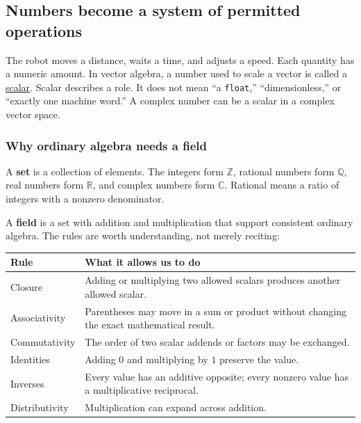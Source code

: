 \subsection{Numbers become a system of permitted operations}\label{numbers-become-a-system-of-permitted-operations}

The robot moves a distance, waits a time, and adjusts a speed. Each quantity has a numeric amount. In vector algebra, a number used to scale a vector is called a \hyperref[01-foundations-i-ch017]{scalar}. Scalar describes a role. It does not mean ``a \texttt{float},'' ``dimensionless,'' or ``exactly one machine word.'' A complex number can be a scalar in a complex vector space.

\subsubsection{Why ordinary algebra needs a field}\label{why-ordinary-algebra-needs-a-field}

A \textbf{set} is a collection of elements. The integers form \(\mathbb Z\), rational numbers form \(\mathbb Q\), real numbers form \(\mathbb R\), and complex numbers form \(\mathbb C\). Rational means a ratio of integers with a nonzero denominator.

A \textbf{field} is a set with addition and multiplication that support consistent ordinary algebra. The rules are worth understanding, not merely reciting:

{\def\LTcaptype{none} %
\begin{longtable}[]{@{}
  >{\raggedright\arraybackslash}p{}
  >{\raggedright\arraybackslash}p{}@{}}
\toprule\noalign{}
\begin{minipage}[b]{\linewidth}\raggedright
Rule
\end{minipage} & \begin{minipage}[b]{\linewidth}\raggedright
What it allows us to do
\end{minipage} \\
\midrule\noalign{}
\endhead
\bottomrule\noalign{}
\endlastfoot
Closure & Adding or multiplying two allowed scalars produces another allowed scalar. \\
Associativity & Parentheses may move in a sum or product without changing the exact mathematical result. \\
Commutativity & The order of two scalar addends or factors may be exchanged. \\
Identities & Adding \(0\) and multiplying by \(1\) preserve the value. \\
Inverses & Every value has an additive opposite; every nonzero value has a multiplicative reciprocal. \\
Distributivity & Multiplication can expand across addition. \\
\end{longtable}
}

